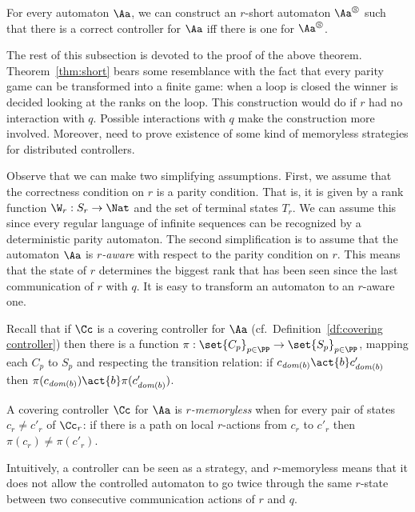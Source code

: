 \documentclass[10pt,a4paper]{article}
\newcommand{\short}[1]{#1^\circledS}
\newcommand{\loc}{\mathit{dom}}
\begin{document}
\begin{theorem}\label{thm:short}
  For every automaton $\Aa$, we can construct an $r$-short automaton
  $\short\Aa$ such that there is a correct controller for $\Aa$ iff
  there is one for $\short\Aa$.
\end{theorem}
The rest of this subsection is devoted to the proof of the above theorem.
Theorem~\ref{thm:short} bears some resemblance with the fact that
every parity game can be transformed into a finite game: when a loop
is closed the winner is decided looking at the ranks on the loop. This
construction would do if $r$ had no interaction with $q$. Possible
interactions with $q$ make the construction more involved. Moreover,
need to prove existence of some kind of memoryless strategies for
distributed controllers.


Observe that we can make two simplifying assumptions. First, we assume
that the correctness condition on $r$ is a parity condition. That is,
it is given by a rank function $\W_r:S_r\to \Nat$ and the set of
terminal states $T_r$. We can assume this since every regular language
of infinite sequences can be recognized by a deterministic parity
automaton. The second simplification is to assume that the automaton $\Aa$ is
\emph{$r$-aware} with respect to the parity condition on $r$. This
means that the state of $r$ determines the biggest rank that
has been seen since the last communication of $r$ with $q$. It is easy
to transform an automaton to an $r$-aware one.










Recall that if $\Cc$ is a covering controller for $\Aa$ (cf.\
Definition~\ref{df:covering controller}) then
there is a function $\pi :\set{C_p}_{p\in
  \PP} \to \set{S_p}_{p\in \PP}$, mapping each $C_p$ to $S_p$ and respecting
the transition relation: if $c_{\loc(b)} \act{b} c'_{\loc(b)}$ then
$\pi(c_{\loc(b)})\act{b}\pi(c'_{\loc(b)})$. 


\begin{definition}
  A covering controller $\Cc$ for $\Aa$ is \emph{$r$-memoryless} when
  for every pair of states $c_r\not=c'_r$ of $\Cc_r$: 
if there
  is a path on local $r$-actions from $c_r$ to $c'_r$ then
  $\pi(c_r)\not=\pi(c'_r)$.
\end{definition}


Intuitively, a controller can be seen as a strategy, and $r$-memoryless
means that it does not allow the controlled automaton to go twice
through the same $r$-state between two consecutive communication
actions of $r$ and $q$.
\end{document}
